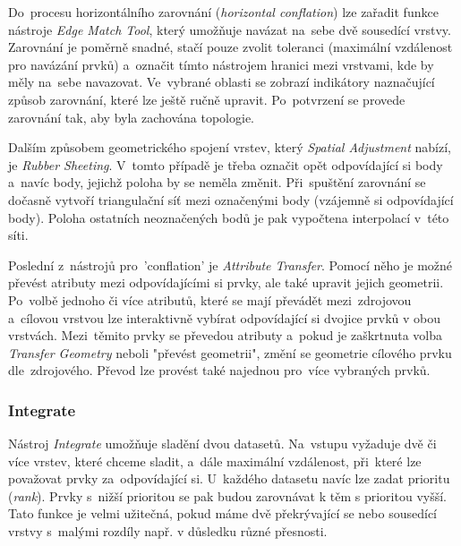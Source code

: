 Do~procesu horizontálního zarovnání (\textit{horizontal conflation}) lze zařadit funkce nástroje \textit{Edge Match Tool}, který umožňuje navázat na~sebe dvě sousedící vrstvy.
Zarovnání je poměrně snadné, stačí pouze zvolit toleranci (maximální vzdálenost pro navázání prvků) a~označit tímto nástrojem hranici mezi vrstvami, kde by měly na~sebe
navazovat. Ve~vybrané oblasti se zobrazí indikátory naznačující způsob zarovnání, které lze ještě ručně upravit. Po~potvrzení se provede zarovnání tak, aby byla zachována
topologie.

Dalším způsobem geometrického spojení vrstev, který \textit{Spatial Adjustment} nabízí, je \textit{Rubber Sheeting}. V~tomto případě je třeba označit opět odpovídající si body
a~navíc body, jejichž poloha by se neměla změnit. Při~spuštění zarovnání se dočasně vytvoří triangulační síť mezi označenými body (vzájemně si odpovídající body). Poloha 
ostatních neoznačených bodů je pak vypočtena interpolací v~této síti.

Poslední z~nástrojů pro~'conflation' je \textit{Attribute Transfer}. Pomocí něho je možné převést atributy mezi odpovídajícími si prvky, ale také upravit jejich geometrii.
Po~volbě jednoho či více atributů, které se mají převádět mezi~zdrojovou a~cílovou vrstvou lze interaktivně vybírat odpovídající si dvojice prvků v obou vrstvách. Mezi~těmito
prvky se převedou atributy a~pokud je zaškrtnuta volba \textit{Transfer Geometry} neboli "převést geometrii", změní se geometrie cílového prvku dle~zdrojového. Převod lze
provést také najednou pro~více vybraných prvků.



\subsubsection{Integrate}

Nástroj \textit{Integrate} umožňuje sladění dvou datasetů. Na~vstupu vyžaduje dvě či více vrstev, které chceme sladit, a~dále maximální vzdálenost, při~které lze považovat
prvky za~odpovídající si. U~každého datasetu navíc lze zadat prioritu (\textit{rank}). Prvky s~nižší prioritou se pak budou zarovnávat k těm s prioritou vyšší. Tato funkce
je velmi užitečná, pokud máme dvě překrývající se nebo sousedící vrstvy s~malými rozdíly např. v důsledku různé přesnosti.

